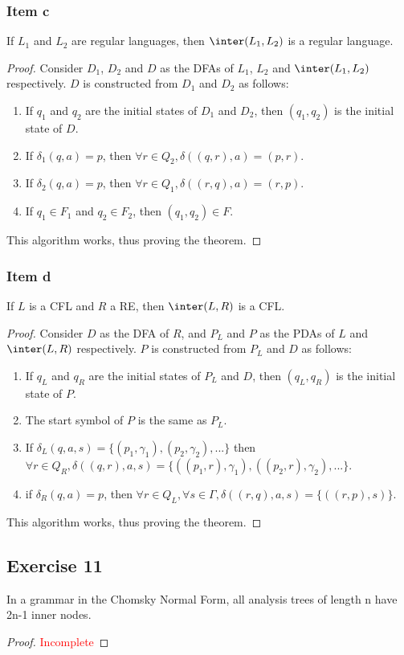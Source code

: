 {\subsubsection{Item c}
\begin{theorem}
	If $L_1$ and $L_2$ are regular languages, then $\inter(L_1,L_2)$ is a regular language.
\end{theorem}
\begin{proof}
Consider $D_1$, $D_2$ and $D$ as the DFAs of $L_1$, $L_2$ and $\inter(L_1,L_2)$ respectively. $D$ is constructed from $D_1$ and $D_2$ as follows:
\begin{enumerate}
	\item If $q_1$ and $q_2$ are the initial states of $D_1$ and $D_2$, then $(q_1,q_2)$ is the initial state of $D$.
	\item If $\delta_1(q,a)=p$, then $\forall r \in Q_2, \delta((q,r),a)=(p,r)$.
	\item If $\delta_2(q,a)=p$, then $\forall r \in Q_1, \delta((r,q),a)=(r,p)$.
	\item If $q_1\in F_1$ and $q_2 \in F_2$, then $(q_1,q_2) \in F$.
\end{enumerate}
This algorithm works, thus proving the theorem.
\end{proof}
\subsubsection{Item d}
\begin{theorem}
	If $L$ is a CFL and $R$ a RE, then $\inter(L,R)$ is a CFL.
\end{theorem}
\begin{proof}
Consider $D$ as the DFA of $R$, and $P_L$ and $P$ as the PDAs of $L$ and $\inter(L,R)$ respectively. $P$ is constructed from $P_L$ and $D$ as follows:
\begin{enumerate}
	\item If $q_L$ and $q_R$ are the initial states of $P_L$ and $D$, then $(q_L, q_R)$ is the initial state of $P$.
	\item The start symbol of $P$ is the same as $P_L$.
	\item If $\delta_L(q,a,s)=\{(p_1,\gamma_1),(p_2,\gamma_2),...\}$ then $\forall r \in Q_R, \delta((q,r),a,s)=\{((p_1,r),\gamma_1),((p_2,r),\gamma_2),...\}$.
	\item if $\delta_R(q,a)=p$, then $\forall r \in Q_L, \forall s \in \Gamma, \delta((r,q),a,s)=\{((r,p),s)\}$.
\end{enumerate}
This algorithm works, thus proving the theorem.
\end{proof}
\subsection{Exercise 11}
\begin{theorem}
In a grammar in the Chomsky Normal Form, all analysis trees of length n have 2n-1 inner nodes.
\end{theorem}
\begin{proof}
\textcolor{red}{Incomplete}
\end{proof}
}
